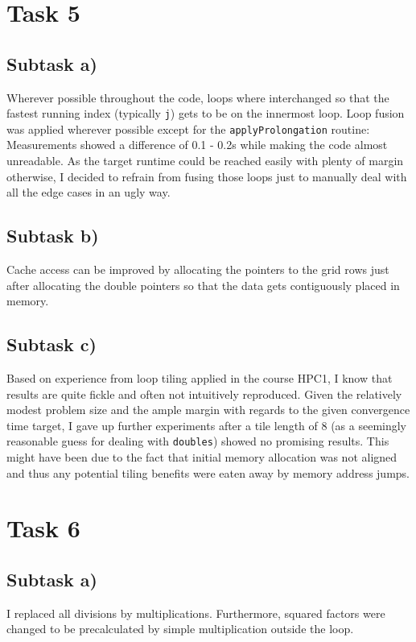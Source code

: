 \documentclass[11pt,a4paper]{article}
\begin{document}
\section{Task 5}

\subsection{Subtask a)}
Wherever possible throughout the code, loops where interchanged so that the fastest
running index (typically \texttt{j}) gets to be on the innermost loop.
Loop fusion was applied wherever possible except for the \texttt{applyProlongation} routine:
Measurements showed a difference of 0.1 - 0.2s while making the code almost unreadable. As the target
runtime could be reached easily with plenty of margin otherwise, I decided to refrain from fusing those loops
just to manually deal with all the edge cases in an ugly way.

\subsection{Subtask b)}
Cache access can be improved by allocating the pointers to the grid rows just after
allocating the double pointers so that the data gets contiguously placed in memory.

\subsection{Subtask c)}
Based on experience from loop tiling applied in the course HPC1, I know that results are
quite fickle and often not intuitively reproduced. Given the relatively modest problem size
and the ample margin with regards to the given convergence time target, I gave up further experiments after
a tile length of 8 (as a seemingly reasonable guess for dealing with \texttt{doubles}) showed no promising results.
This might have been due to the fact that initial memory allocation was not aligned and thus any potential tiling
benefits were eaten away by memory address jumps.

\section{Task 6}

\subsection{Subtask a)}

I replaced all divisions by multiplications. Furthermore, squared factors were
changed to be precalculated by simple multiplication outside the loop.
\end{document}

